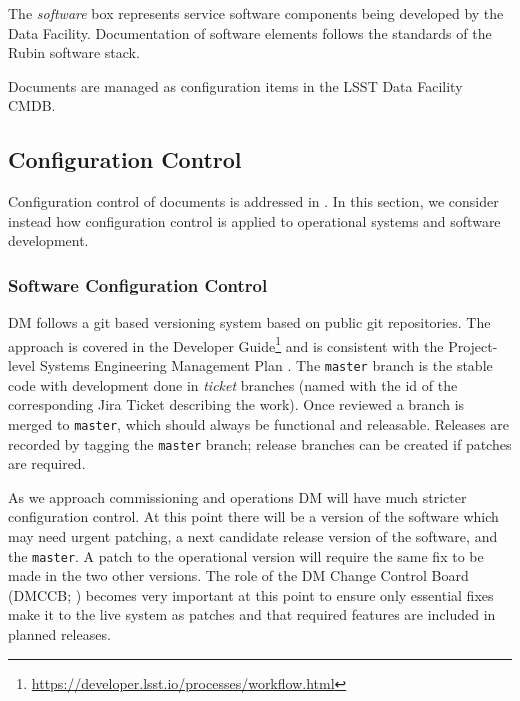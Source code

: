 The \textit{software} box represents service software components being developed by the Data Facility.
Documentation of software elements follows the standards of the Rubin software \gls{stack}.

Documents are managed as \gls{configuration} items in the LSST Data Facility \gls{CMDB}.

\subsection {Configuration Control} \label{sect:config}

Configuration control of documents is addressed in . In this section, we consider instead how \gls{configuration} control is applied to operational systems and software development.

\subsubsection{Software Configuration Control}

DM  follows a \gls{git} based versioning system based on public \gls{git} repositories.  The approach is covered in the Developer Guide\footnote{\url{https://developer.lsst.io/processes/workflow.html}} and is consistent with the Project-level \gls{Systems Engineering} Management Plan .
The \texttt{master} branch is the stable code with development done in \emph{ticket} branches (named with the id of the corresponding Jira Ticket describing the work).
Once reviewed a branch is merged to \texttt{master}, which should always be functional and releasable.
Releases are recorded by tagging the \texttt{master} branch; release branches can be created if patches are required.

As we approach commissioning and operations DM will have much stricter \gls{configuration} control.
At this point there will be a version of the software which may need urgent patching, a next candidate release version of the software, and the \texttt{master}.
A \gls{patch} to the operational version will require the same fix to be made in the two other versions.
The role of the DM  \gls{Change Control Board} (\gls{DMCCB}; ) becomes very important at this point to ensure only essential fixes make it to the live system as patches and that required features are included in planned releases.

